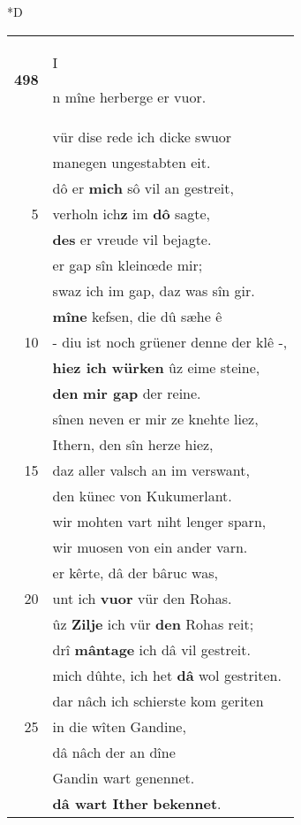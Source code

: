 \documentclass[8pt,a4paper,notitlepage]{article}
\begin{document}
\begin{table}[ht]
\begin{minipage}[t]{0.5\linewidth}
\small
\begin{center}*D
\end{center}
\begin{tabular}{rl}
\textbf{498} & \begin{large}I\end{large}n mîne herberge er vuor.\\ 
 & vür dise rede ich dicke swuor\\ 
 & manegen ungestabten eit.\\ 
 & dô er \textbf{mich} sô vil an gestreit,\\ 
5 & verholn ich\textbf{z} im \textbf{dô} sagte,\\ 
 & \textbf{des} er vreude vil bejagte.\\ 
 & er gap sîn kleinœde mir;\\ 
 & swaz ich im gap, daz was sîn gir.\\ 
 & \textbf{mîne} kefsen, die dû sæhe ê\\ 
10 & - diu ist noch grüener denne der klê -,\\ 
 & \textbf{hiez ich würken} ûz eime steine,\\ 
 & \textbf{den} \textbf{mir gap} der reine.\\ 
 & sînen neven er mir ze knehte liez,\\ 
 & Ithern, den sîn herze hiez,\\ 
15 & daz aller valsch an im verswant,\\ 
 & den künec von Kukumerlant.\\ 
 & wir mohten vart niht lenger sparn,\\ 
 & wir muosen von ein ander varn.\\ 
 & er kêrte, dâ der bâruc was,\\ 
20 & unt ich \textbf{vuor} vür den Rohas.\\ 
 & ûz \textbf{Zilje} ich vür \textbf{den} Rohas reit;\\ 
 & drî \textbf{mântage} ich dâ vil gestreit.\\ 
 & mich dûhte, ich het \textbf{dâ} wol gestriten.\\ 
 & dar nâch ich schierste kom geriten\\ 
25 & in die wîten Gandine,\\ 
 & dâ nâch der an dîne\\ 
 & Gandin wart genennet.\\ 
 & \textbf{dâ wart Ither} \textbf{bekennet}.\\ 

\end{tabular}
\end{minipage}
\end{table}
\end{document}
